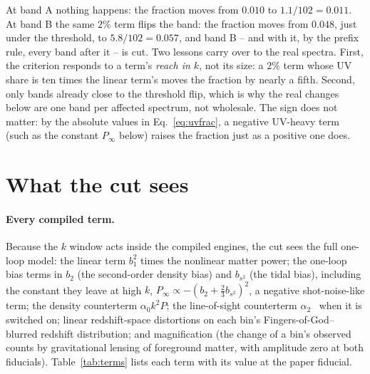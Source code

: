 \documentclass[11pt]{article}
\begin{document}
At band A nothing happens: the fraction moves from $0.010$ to
$1.1/102 = 0.011$.  At band B the same $2\%$ term flips the band:
the fraction moves from $0.048$, just under the threshold, to
$5.8/102 = 0.057$, and band B -- and with it, by the prefix rule,
every band after it -- is cut.  Two lessons carry over to the real
spectra.  First, the criterion responds to a term's \emph{reach in
$k$}, not its size: a $2\%$ term whose UV share is ten times the
linear term's moves the fraction by nearly a fifth.  Second, only
bands already close to the threshold flip, which is why the real
changes below are one band per affected spectrum, not wholesale.
The sign does not matter: by the absolute values in
Eq.~\eqref{eq:uvfrac}, a negative UV-heavy term (such as the
constant $P_\infty$ below) raises the fraction just as a positive
one does.

\section{What the cut sees}
\label{sec:sees}

\paragraph{Every compiled term.}
Because the $k$ window acts inside the compiled engines, the cut
sees the full one-loop model: the linear term $b_1^2$ times the
nonlinear matter power; the one-loop bias terms in $b_2$ (the
second-order density bias) and $b_{s^2}$ (the tidal bias), including
the constant they leave at high $k$,
$P_\infty \propto -(b_2 + \tfrac{2}{3} b_{s^2})^2$, a negative
shot-noise-like term; the density counterterm $\alpha_0 k^2 P$; the
line-of-sight counterterm $\alpha_2$~\cite{Maus2024} when it is
switched on; linear redshift-space distortions on each bin's
Fingers-of-God--blurred redshift distribution; and magnification (the
change of a bin's observed counts by gravitational lensing of
foreground matter, with amplitude zero at both fiducials).
Table~\ref{tab:terms} lists each term with its value at the paper
fiducial.
\end{document}
